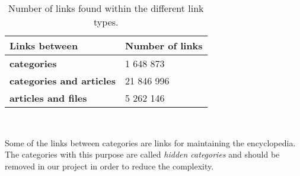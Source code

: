 \begin{table}[h]
\centering
\renewcommand{\arraystretch}{1.25}
\begin{tabular}{l|l} %
\textbf{Links between} & \textbf{Number of links} \\ \hline
\textbf{categories} &  1 648 873\\ \hline
\textbf{categories and articles} & 21 846 996 \\ \hline
\textbf{articles and files} & 5 262 146 
\end{tabular}
\\[10pt]
\caption{Number of links found within the different link types.}
\label{tab:enwikicatlinks}
\end{table}



Some of the links between categories are links for maintaining the encyclopedia. The categories with this purpose are called \emph{hidden categories} and should be removed in our project in order to reduce the complexity.
